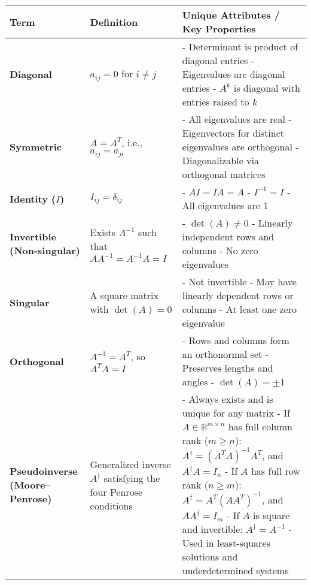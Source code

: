 \documentclass[12pt]{article}
\begin{document}
\begin{adjustwidth}{-1cm}{-2cm} %
		\begin{longtable}{|>{\bfseries}m{3.5cm}|m{5cm}|m{10.5cm}|}
				\hline
				\textbf{Term} & \textbf{Definition} & \textbf{Unique Attributes /
				Key Properties} \\
				\hline
				Diagonal & $a_{ij} = 0$ for $i \ne j$ &
				- Determinant is product of diagonal entries \newline
				- Eigenvalues are diagonal entries \newline
				- $A^k$ is diagonal with entries raised to $k$ \\
				\hline
				Symmetric & $A = A^T$, i.e., $a_{ij} = a_{ji}$ &
				- All eigenvalues are real \newline
				- Eigenvectors for distinct eigenvalues are orthogonal \newline
				- Diagonalizable via orthogonal matrices \\
				\hline
				Identity ($I$) & $I_{ij} = \delta_{ij}$ &
				- $AI = IA = A$ \newline
				- $I^{-1} = I$ \newline
				- All eigenvalues are 1 \\
				\hline
				Invertible (Non-singular) & Exists $A^{-1}$ such that $AA^{-1} =
				A^{-1}A = I$ &
				- $\det(A) \ne 0$ \newline
				- Linearly independent rows and columns \newline
				- No zero eigenvalues \\
				\hline
				Singular & A square matrix with $\det(A) = 0$ &
				- Not invertible \newline
				- May have linearly dependent rows or columns \newline
				- At least one zero eigenvalue \\
				\hline
				Orthogonal & $A^{-1} = A^T$, so $A^T A = I$ &
				- Rows and columns form an orthonormal set \newline
				- Preserves lengths and angles \newline
				- $\det(A) = \pm 1$ \\

				\hline
				Pseudoinverse (Moore--Penrose) & Generalized inverse $A^\dagger$
				satisfying the four Penrose conditions &
				- Always exists and is unique for any matrix \newline
				- If $A \in \mathbb{R}^{m \times n}$ has full column rank ($m \ge
				n$): \newline
				\quad $A^\dagger = (A^T A)^{-1} A^T$, and $A^\dagger A = I_n$ \newline
				- If $A$ has full row rank ($n \ge m$): \newline
				\quad $A^\dagger = A^T (A A^T)^{-1}$, and $A A^\dagger = I_m$ \newline
				- If $A$ is square and invertible: $A^\dagger = A^{-1}$ \newline
				- Used in least-squares solutions and underdetermined systems \\


\end{longtable}
\end{adjustwidth}
\end{document}

